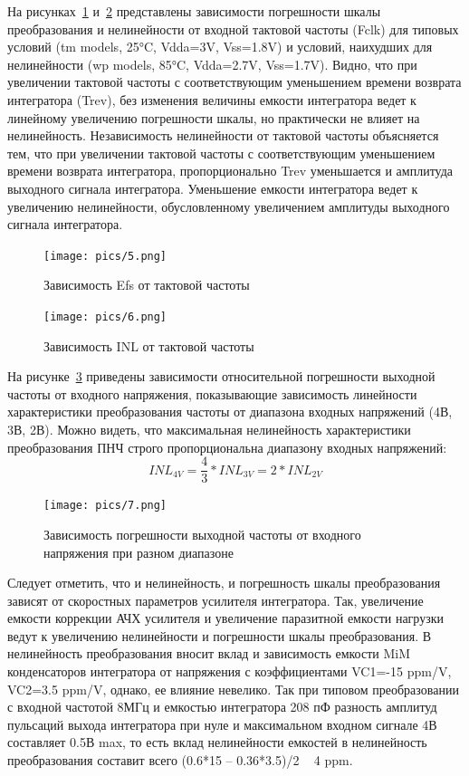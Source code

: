 \documentclass[a4paper,12pt,oneside]{scrartcl}
\begin{document}
На рисунках~\ref{fig:diagg5} и~\ref{fig:diagg6} представлены зависимости погрешности шкалы преобразования и нелинейности от входной тактовой частоты (Fclk) для типовых условий (tm models, 25°C, Vdda=3V, Vss=1.8V) и условий, наихудших для нелинейности (wp models, 85°C, Vdda=2.7V, Vss=1.7V). Видно, что при увеличении тактовой частоты с соответствующим уменьшением времени возврата интегратора (Trev), без изменения величины емкости интегратора ведет к линейному увеличению погрешности шкалы, но практически не влияет на нелинейность. Независимость нелинейности от тактовой частоты объясняется тем, что при увеличении тактовой частоты с соответствующим уменьшением времени возврата интегратора, пропорционально Trev уменьшается и амплитуда выходного сигнала интегратора. 
Уменьшение емкости интегратора ведет к увеличению нелинейности, обусловленному увеличением амплитуды выходного сигнала интегратора.

\begin{figure}[!htb]
\centering
\texttt{[image: pics/5.png]}
\caption{Зависимость Efs от тактовой частоты}
\label{fig:diagg5}
\end{figure}
\FloatBarrier

\begin{figure}[!htb]
\centering
\texttt{[image: pics/6.png]}
\caption{Зависимость INL от тактовой частоты}
\label{fig:diagg6}
\end{figure}
\FloatBarrier

На рисунке~\ref{fig:diagg7} приведены зависимости относительной погрешности выходной частоты от входного напряжения, показывающие зависимость линейности характеристики преобразования частоты от диапазона входных напряжений (4В, 3В, 2В). Можно видеть, что максимальная нелинейность характеристики преобразования ПНЧ строго пропорциональна диапазону входных напряжений: 
$$INL_{4V} = \frac{4}{3}*INL_{3V}= 2*INL_{2V}$$


\begin{figure}[!htb]
\centering
\texttt{[image: pics/7.png]}
\caption{Зависимость погрешности выходной частоты от входного напряжения при разном диапазоне}
\label{fig:diagg7}
\end{figure}
\FloatBarrier


Следует отметить, что и нелинейность, и погрешность шкалы преобразования зависят от скоростных параметров усилителя интегратора. Так, увеличение емкости коррекции АЧХ усилителя и увеличение паразитной емкости нагрузки ведут к увеличению нелинейности и погрешности шкалы преобразования.
В нелинейность преобразования вносит вклад и зависимость емкости MiM конденсаторов интегратора от напряжения с коэффициентами VC1=-15 ppm/V, VC2=3.5 ppm/V, однако, ее влияние невелико. Так при типовом преобразовании с входной частотой 8МГц и емкостью интегратора 208 пФ разность амплитуд пульсаций выхода интегратора при нуле и максимальном входном сигнале 4В составляет 0.5В max, то есть вклад нелинейности емкостей в нелинейность преобразования составит всего (0.6*15 – 0.36*3.5)/2 ~ 4 ppm.
\end{document}
